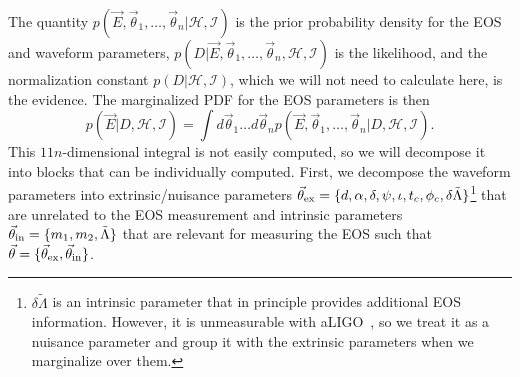 \documentclass[twocolumn,prd,amssymb,aps,nofootinbib,showpacs,epsf]{revtex4}
\begin{document}
The quantity $p(\vec E,\vec\theta_1,\dots,\vec\theta_n | \mathcal{H},\mathcal{I})$ is the prior probability density for the EOS and waveform parameters, $p(D | \vec E,\vec\theta_1,\dots,\vec\theta_n,\mathcal{H},\mathcal{I})$ is the likelihood, and the normalization constant $p(D | \mathcal{H},\mathcal{I})$, which we will not need to calculate here, is the evidence. The marginalized PDF for the EOS parameters is then
\begin{equation}
\label{eq:margEOS}
p(\vec E | D,\mathcal{H},\mathcal{I}) = \int d\vec\theta_1 \dots d\vec\theta_n p(\vec E,\vec\theta_1,\dots,\vec\theta_n | D,\mathcal{H},\mathcal{I}).
\end{equation}
This $11n$-dimensional integral is not easily computed, so we will decompose it into blocks that can be individually computed. First, we decompose the waveform parameters into extrinsic/nuisance parameters $\vec\theta_{\rm ex} = \{d, \alpha, \delta, \psi, \iota, t_c, \phi_c, \delta\tilde\Lambda\}$\footnote{$\delta\tilde\Lambda$ is an intrinsic parameter that in principle provides additional EOS information. However, it is unmeasurable with aLIGO~\cite{WadeCreightonOchsner2014}, so we treat it as a nuisance parameter and group it with the extrinsic parameters when we marginalize over them.} that are unrelated to the EOS measurement and intrinsic parameters $\vec\theta_{\rm in} = \{m_1, m_2, \tilde\Lambda\}$ that are relevant for measuring the EOS such that $\vec\theta = \{\vec\theta_{\rm ex}, \vec\theta_{\rm in}\}$.

\end{document}
